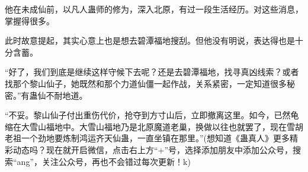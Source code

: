 \begin{this_body}
他在未成仙前，以凡人蛊师的修为，深入北原，有过一段生活经历。对这些消息，掌握得很多。

此时故意提起，其实心意上也是想去碧潭福地搜刮。但他没有明说，表达得也是十分含蓄。

“好了，我们到底是继续这样守候下去呢？还是去碧潭福地，找寻真凶线索？或者找那个黎山仙子，她既然和那个力道仙僵一起作战，关系紧密，一定知道很多秘密。”有蛊仙不耐地道。

“不妥。黎山仙子付出重伤代价，抢夺到方寸山后，立即撤离这里。如今，已然龟缩在大雪山福地中。大雪山福地乃是北原魔道老巢，换做以往也就罢了，现在雪胡老祖一个劲地要炼制鸿运齐天仙蛊，一直坐镇在那里。”(想知道《蛊真人》更多精彩动态吗？现在就开启微信，点击右上方“+”号，选择添加朋友中添加公众号，搜索“ang”，关注公众号，再也不会错过每次更新！k)

\end{this_body}

